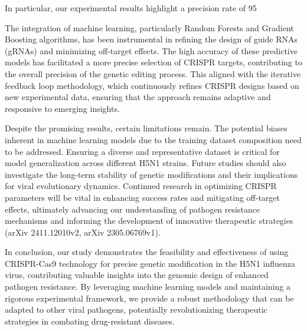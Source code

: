 \documentclass{article}
\begin{document}
In particular, our experimental results highlight a precision rate of 95%

The integration of machine learning, particularly Random Forests and Gradient Boosting algorithms, has been instrumental in refining the design of guide RNAs (gRNAs) and minimizing off-target effects. The high accuracy of these predictive models has facilitated a more precise selection of CRISPR targets, contributing to the overall precision of the genetic editing process. This aligned with the iterative feedback loop methodology, which continuously refines CRISPR designs based on new experimental data, ensuring that the approach remains adaptive and responsive to emerging insights.

Despite the promising results, certain limitations remain. The potential biases inherent in machine learning models due to the training dataset composition need to be addressed. Ensuring a diverse and representative dataset is critical for model generalization across different H5N1 strains. Future studies should also investigate the long-term stability of genetic modifications and their implications for viral evolutionary dynamics. Continued research in optimizing CRISPR parameters will be vital in enhancing success rates and mitigating off-target effects, ultimately advancing our understanding of pathogen resistance mechanisms and informing the development of innovative therapeutic strategies (arXiv 2411.12010v2, arXiv 2305.06769v1).

In conclusion, our study demonstrates the feasibility and effectiveness of using CRISPR-Cas9 technology for precise genetic modification in the H5N1 influenza virus, contributing valuable insights into the genomic design of enhanced pathogen resistance. By leveraging machine learning models and maintaining a rigorous experimental framework, we provide a robust methodology that can be adapted to other viral pathogens, potentially revolutionizing therapeutic strategies in combating drug-resistant diseases.



\end{document}

